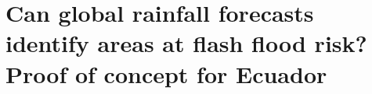\chapter{Can global rainfall forecasts identify areas at flash flood risk? Proof of concept for Ecuador}
\label{flash_flood_focuse_rainfall_verification}
\graphicspath{{chapter_05/figures}{chapter_05/tables}}
